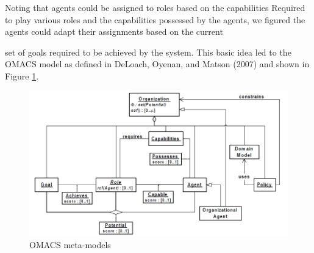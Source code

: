 Noting that agents could be assigned to roles based on the capabilities 
Required to play various roles and the capabilities possessed by the agents,
we figured the agents could adapt their assignments based on the current 


set of goals required to be achieved by the system.
This basic idea led to the OMACS model as defined in DeLoach,
Oyenan, and Matson (2007) and shown in Figure \ref{fig:OMACS meta-models}\cite{omacs4}.

\begin{figure}[th]
	\centering
		\includegraphics[scale=0.6]{ch1/img/omacs}
	\caption{\label{fig:OMACS meta-models}OMACS meta-models \cite{omacs0}}
\end{figure}

